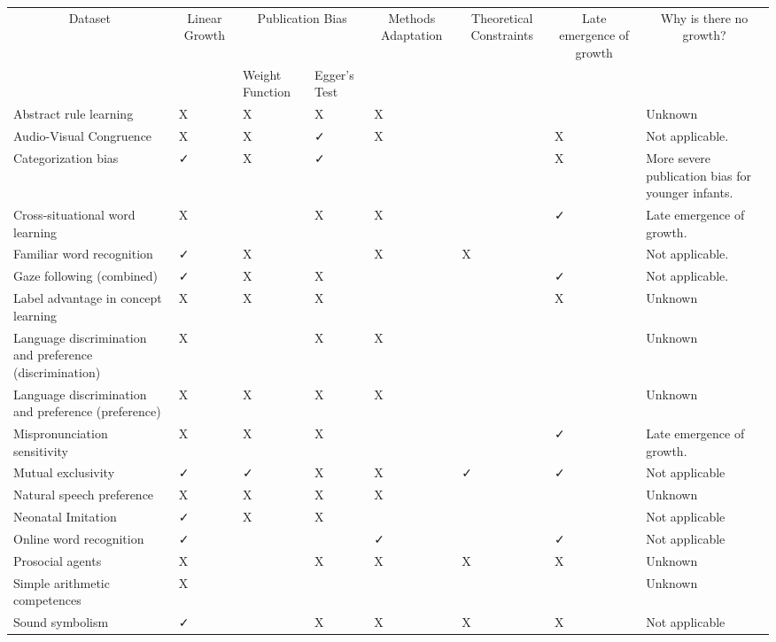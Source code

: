 \documentclass[
]{article}
\begin{document}
\begin{tabular}{llllllll}
\toprule
\multicolumn{1}{c}{Dataset} & \multicolumn{1}{c}{Linear Growth} & \multicolumn{2}{c}{Publication Bias} & \multicolumn{1}{c}{Methods Adaptation} & \multicolumn{1}{c}{Theoretical Constraints} & \multicolumn{1}{c}{Late emergence of growth} & \multicolumn{1}{c}{Why is there no growth?} \\
\cmidrule(l{3pt}r{3pt}){1-1} \cmidrule(l{3pt}r{3pt}){2-2} \cmidrule(l{3pt}r{3pt}){3-4} \cmidrule(l{3pt}r{3pt}){5-5} \cmidrule(l{3pt}r{3pt}){6-6} \cmidrule(l{3pt}r{3pt}){7-7} \cmidrule(l{3pt}r{3pt}){8-8}
 &  & Weight Function & Egger's Test &  &  &  & \\
\midrule
Abstract rule learning & X & X & X & X &  &  & Unknown\\
Audio-Visual Congruence & X & X & ✓ & X &  & X & Not applicable.\\
Categorization bias & ✓ & X & ✓ &  &  & X & More severe publication bias for younger infants.\\
Cross-situational word learning & X &  & X & X &  & ✓ & Late emergence of growth.\\
Familiar word recognition & ✓ & X &  & X & X &  & Not applicable.\\
\addlinespace
Gaze following (combined) & ✓ & X & X &  &  & ✓ & Not applicable.\\
Label advantage in concept learning & X & X & X &  &  & X & Unknown\\
Language discrimination and preference (discrimination) & X &  & X & X &  &  & Unknown\\
Language discrimination and preference (preference) & X & X & X & X &  &  & Unknown\\
Mispronunciation sensitivity & X & X & X &  &  & ✓ & Late emergence of growth.\\
\addlinespace
Mutual exclusivity & ✓ & ✓ & X & X & ✓ & ✓ & Not applicable\\
Natural speech preference & X & X & X & X &  &  & Unknown\\
Neonatal Imitation & ✓ & X & X &  &  &  & Not applicable\\
Online word recognition & ✓ &  &  & ✓ &  & ✓ & Not applicable\\
Prosocial agents & X &  & X & X & X & X & Unknown\\
\addlinespace
Simple arithmetic competences & X &  &  &  &  &  & Unknown\\
Sound symbolism & ✓ &  & X & X & X & X & Not applicable\\

\end{tabular}
\end{document}
